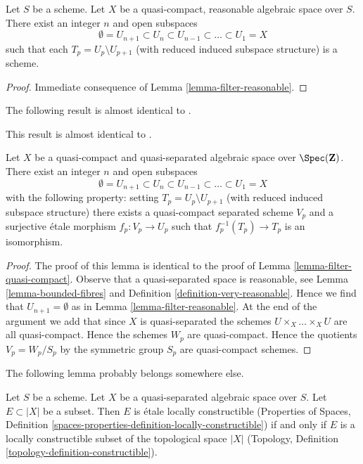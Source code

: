 \begin{lemma}
\label{lemma-stratify-reasonable}
Let $S$ be a scheme. Let $X$ be a quasi-compact, reasonable algebraic space
over $S$. There exist an integer $n$ and open subspaces
$$
\emptyset = U_{n + 1} \subset
U_n \subset U_{n - 1} \subset \ldots \subset U_1 = X
$$
such that each $T_p = U_p \setminus U_{p + 1}$ (with reduced induced subspace
structure) is a scheme.
\end{lemma}

\begin{proof}
Immediate consequence of Lemma \ref{lemma-filter-reasonable}.
\end{proof}

\noindent
The following result is almost identical to
\cite[Proposition 5.7.8]{GruRay}.

\begin{lemma}
\label{lemma-filter-quasi-compact-quasi-separated}
\begin{reference}
This result is almost identical to \cite[Proposition 5.7.8]{GruRay}.
\end{reference}
Let $X$ be a quasi-compact and quasi-separated algebraic space over
$\Spec(\mathbf{Z})$. There exist an integer $n$ and open subspaces
$$
\emptyset = U_{n + 1} \subset
U_n \subset U_{n - 1} \subset \ldots \subset U_1 = X
$$
with the following property: setting $T_p = U_p \setminus U_{p + 1}$
(with reduced induced subspace structure) there exists a quasi-compact
separated scheme $V_p$ and a surjective \'etale morphism $f_p : V_p \to U_p$
such that $f_p^{-1}(T_p) \to T_p$ is an isomorphism.
\end{lemma}

\begin{proof}
The proof of this lemma is identical to the proof of
Lemma \ref{lemma-filter-quasi-compact}.
Observe that a quasi-separated space is reasonable, see
Lemma \ref{lemma-bounded-fibres} and
Definition \ref{definition-very-reasonable}.
Hence we find that $U_{n + 1} = \emptyset$ as in
Lemma \ref{lemma-filter-reasonable}.
At the end of the argument we add that since $X$ is quasi-separated
the schemes $U \times_X \ldots \times_X U$ are all quasi-compact.
Hence the schemes $W_p$ are quasi-compact. Hence the
quotients $V_p = W_p/S_p$ by the symmetric group $S_p$ are quasi-compact
schemes.
\end{proof}

\noindent
The following lemma probably belongs somewhere else.

\begin{lemma}
\label{lemma-locally-constructible}
Let $S$ be a scheme. Let $X$ be a quasi-separated algebraic space over $S$.
Let $E \subset |X|$ be a subset. Then $E$ is \'etale locally constructible
(Properties of Spaces, Definition
\ref{spaces-properties-definition-locally-constructible})
if and only if $E$ is a locally constructible subset of
the topological space $|X|$
(Topology, Definition \ref{topology-definition-constructible}).
\end{lemma}

